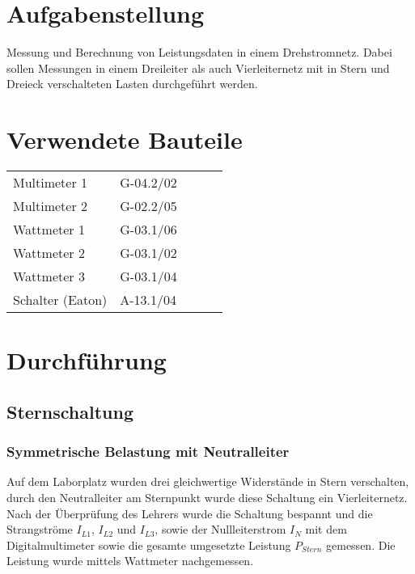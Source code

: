 \documentclass[11pt,a4paper,fleqn]{scrartcl}
\begin{document}
	\indextrue    %
	\Titelseite
	\ifindex\else\tableofcontents\newpage\fi

	\section{Aufgabenstellung}

	Messung und Berechnung von Leistungsdaten in einem Drehstromnetz. Dabei sollen Messungen in einem Dreileiter als auch Vierleiternetz mit in Stern und Dreieck verschalteten Lasten durchgeführt werden.

	\section{Verwendete Bauteile}
	\begin{table}[h!]
		\begin{tabular}{|l|l|lll}
			\cline{1-2}
			Multimeter   1     & G-04.2/02 &  &  &  \\ \cline{1-2}
			Multimeter   2     & G-02.2/05 &  &  &  \\ \cline{1-2}
			Wattmeter 1        & G-03.1/06 &  &  &  \\ \cline{1-2}
			Wattmeter 2        & G-03.1/02 &  &  &  \\ \cline{1-2}
			Wattmeter 3        & G-03.1/04 &  &  &  \\ \cline{1-2}
			Schalter   (Eaton) & A-13.1/04 &  &  &  \\ \cline{1-2}
		\end{tabular}
		\label{tab:Bauteile}
	\end{table}

	\section{Durchführung}

	\subsection{Sternschaltung}

	\subsubsection{Symmetrische Belastung mit Neutralleiter}

	Auf dem Laborplatz wurden drei gleichwertige Widerstände in Stern verschalten, durch den Neutralleiter am Sternpunkt wurde diese Schaltung ein Vierleiternetz.
	Nach der Überprüfung des Lehrers wurde die Schaltung bespannt und die Strangströme $I_{L1}$, $I_{L2}$ und $I_{L3}$, sowie der Nullleiterstrom $I_{N}$ mit dem Digitalmultimeter sowie die gesamte umgesetzte Leistung $P_{Stern}$ gemessen. Die Leistung wurde mittels Wattmeter nachgemessen.
\end{document}
